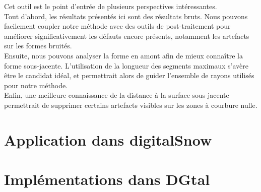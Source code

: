 Cet outil est le point d'entrée de plusieurs perspectives intéressantes.\\
%
Tout d'abord, les résultats présentés ici sont des résultats bruts. Nous pouvons
facilement coupler notre méthode avec des outils de post-traitement pour
améliorer significativement les défauts encore présents, notamment les artefacts
sur les formes bruités.\\
%
Ensuite, nous pouvons analyser la forme en amont afin de mieux connaître la
forme sous-jacente. L'utilisation de la longueur des segments maximaux s'avère
être le candidat idéal, et permettrait alors de guider l'ensemble de rayons
utilisés pour notre méthode.\\
%
Enfin, une meilleure connaissance de la distance à la surface sous-jacente
permettrait de supprimer certains artefacts visibles sur les zones à courbure
nulle.

%
%
\section{Application dans digitalSnow}%
\label{sec:applications:digitalsnow}
%
\section{Implémentations dans DGtal}%
\label{sec:applications:dgtal}
%
